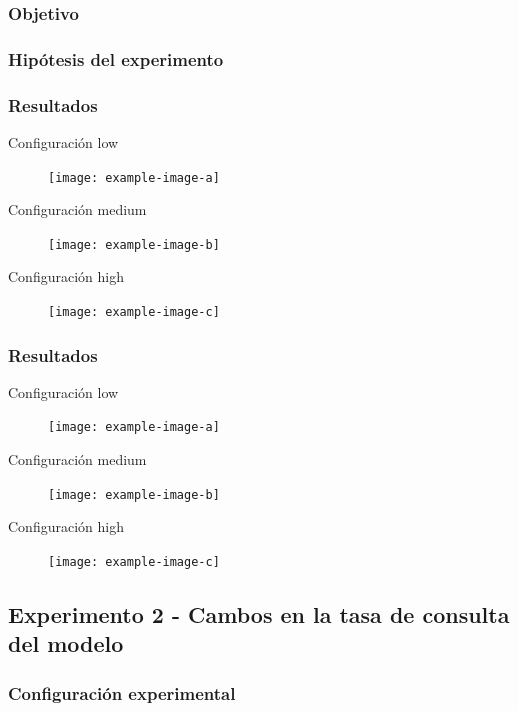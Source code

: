 \subsubsection{Objetivo}
\subsubsection{Hipótesis del experimento}
\subsubsection{Resultados}

Configuración low
\begin{figure}[H]
    \centering
    \texttt{[image: example-image-a]}
\end{figure}


Configuración medium
\begin{figure}[H]
    \centering
    \texttt{[image: example-image-b]}
\end{figure}

Configuración high
\begin{figure}[H]
    \centering
    \texttt{[image: example-image-c]}
\end{figure}

\subsubsection{Resultados}

Configuración low
\begin{figure}[H]
    \centering
    \texttt{[image: example-image-a]}
\end{figure}


Configuración medium
\begin{figure}[H]
    \centering
    \texttt{[image: example-image-b]}
\end{figure}

Configuración high
\begin{figure}[H]
    \centering
    \texttt{[image: example-image-c]}
\end{figure}




\subsection{Experimento 2 - Cambos en la tasa de consulta del modelo}\label{subsection:exp-epsilon}



\subsubsection{Configuración experimental}

